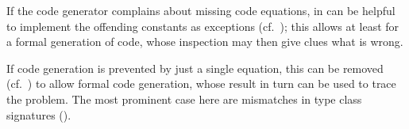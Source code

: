 \begin{isabellebody}
\begin{isamarkuptext}
\begin{description}
      If the code generator
      complains about missing code equations, in can be helpful to
      implement the offending constants as exceptions
      (cf.~); this allows at least for a formal
      generation of code, whose inspection may then give clues what is
      wrong.

      If code
      generation is prevented by just a single equation, this can be
      removed (cf.~) to allow formal code
      generation, whose result in turn can be used to trace the
      problem.  The most prominent case here are mismatches in type
      class signatures ().

  \end{description}%
\end{isamarkuptext}%
\isamarkuptrue%
%
\isadelimtheory
%
\endisadelimtheory
%
\isatagtheory
{}\isamarkupfalse%
%
\endisatagtheory
{\isafoldtheory}%
%
\isadelimtheory
%
\endisadelimtheory
\isanewline
\end{isabellebody}%
